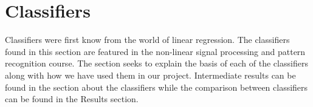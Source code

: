 \section{Classifiers}
Classifiers were first know from the world of linear regression. The classifiers found in this section are featured in the non-linear signal processing and pattern recognition course. The section seeks to explain the basis of each of the classifiers along with how we have used them in our project. Intermediate results can be found in the section about the classifiers while the comparison between classifiers can be found in the Results section.









\begingroup
	\raggedright
\endgroup



